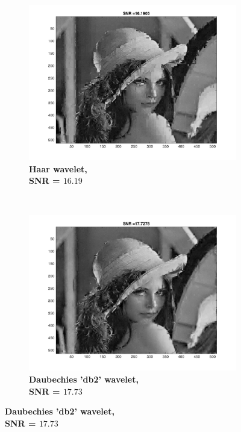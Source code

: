 \begin{figure}
    \centering
    \begin{subfigure}[b]{0.45\textwidth}
        \includegraphics[width=\textwidth]{../src/inpainting/vraag_2_4_haar}
        \caption{\textbf{Haar wavelet, \\ SNR = $\mathbf{16.19}$} }
        \label{fig:matti_fig_haar}
    \end{subfigure}
    ~ %
    \begin{subfigure}[b]{0.45\textwidth}
        \includegraphics[width=\textwidth]{../src/inpainting/vraag_2_4_db2}
        \caption{\textbf{Daubechies 'db2' wavelet, \\ SNR = $\mathbf{17.73}$} }

\end{subfigure}
\end{figure}
